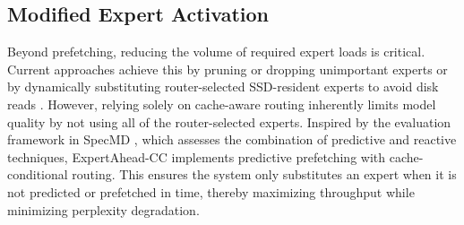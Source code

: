 \subsection{Modified Expert Activation}
Beyond prefetching, reducing the volume of required expert loads is critical. Current approaches achieve this by pruning or dropping unimportant experts \cite{chen2022taskspecificexpertpruningsparse, qiu2025demonsdetailimplementingload} or by dynamically substituting router-selected SSD-resident experts to avoid disk reads \cite{skliar2025mixturecacheconditionalexpertsefficient, zhu2026smoealgorithmsystemcodesignpushing}. However, relying solely on cache-aware routing inherently limits model quality by not using all of the router-selected experts. Inspired by the evaluation framework in SpecMD \cite{hoang2026specmdcomprehensivestudyspeculative}, which assesses the combination of predictive and reactive techniques, ExpertAhead-CC implements predictive prefetching with cache-conditional routing. This ensures the system only substitutes an expert when it is not predicted or prefetched in time, thereby maximizing throughput while minimizing perplexity degradation.
